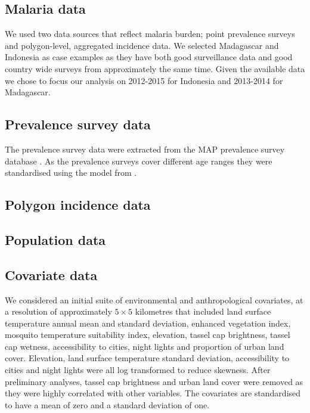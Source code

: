 \documentclass[10pt,letterpaper]{article}
\begin{document}
\subsection*{Malaria data}

We used two data sources that reflect malaria burden; point prevalence surveys and polygon-level, aggregated incidence data.
We selected Madagascar and Indonesia as case examples as they have both good surveillance data and good country wide surveys from approximately the same time.
Given the available data we chose to focus our analysis on 2012-2015 for Indonesia and 2013-2014 for Madagascar.

\subsection*{Prevalence survey data}

The prevalence survey data were extracted from the MAP prevalence survey database \cite{bhatt2015effect}.
As the prevalence surveys cover different age ranges they were standardised using the model from \cite{smith2007standardizing}.

\subsection*{Polygon incidence data}


\subsection*{Population data}

\subsection*{Covariate data}

We considered an initial suite of environmental and anthropological covariates, at a resolution of approximately $5 \times 5$ kilometres that included land surface temperature annual mean and standard deviation, enhanced vegetation index, mosquito temperature suitability index, elevation, tassel cap brightness, tassel cap wetness, accessibility to cities, night lights and proportion of urban land cover.
Elevation, land surface temperature standard deviation, accessibility to cities and night lights were all log transformed to reduce skewness.
After preliminary analyses, tassel cap brightness and urban land cover were removed as they were highly correlated with other variables.
The covariates are standardised to have a mean of zero and a standard deviation of one.
\end{document}

